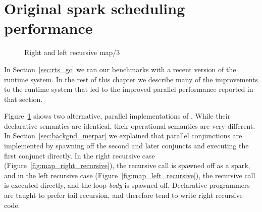 
\section{Original spark scheduling performance}
\label{sec:rts_original_scheduling_performance}

\begin{figure}
\begin{center}
%
\end{center}
\caption{Right and left recursive map/3}
\label{fig:map_right_and_left_recursive}
\end{figure}

In Section~\ref{sec:rts_gc} we ran our benchmarks with a recent version of the
runtime system.
In the rest of this chapter we describe many of the improvements to the
runtime system that led to the improved parallel performance reported in
that section.

Figure~\ref{fig:map_right_and_left_recursive} shows two alternative, parallel
implementations of .
While their declarative semantics are identical,
their operational semantics are very different.
In Section~\ref{sec:backgnd_merpar} we explained that parallel conjunctions
are implemented by spawning off the second and later conjuncts and executing
the first conjunct directly.
In the right recursive case (Figure~\ref{fig:map_right_recursive}),
the recursive call is spawned off as a spark,
and in the left recursive case (Figure~\ref{fig:map_left_recursive}),
the recursive call is executed directly, and the loop \emph{body} is
spawned off.
Declarative programmers are taught to prefer tail recursion,
and therefore tend to write right recursive code.

